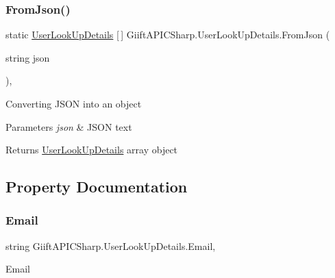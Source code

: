 \subsubsection{\texorpdfstring{From\+Json()}{FromJson()}}
{\footnotesize\ttfamily static \hyperlink{class_giift_a_p_i_c_sharp_1_1_user_look_up_details}{User\+Look\+Up\+Details} \mbox{[}$\,$\mbox{]} Giift\+A\+P\+I\+C\+Sharp.\+User\+Look\+Up\+Details.\+From\+Json (\begin{DoxyParamCaption}\item[{string}]{json }\end{DoxyParamCaption})\hspace{0.3cm}{\ttfamily [inline]}, {\ttfamily [static]}}



Converting J\+S\+ON into an object 


\begin{DoxyParams}{Parameters}
{\em json} & J\+S\+ON text\\
\hline
\end{DoxyParams}
\begin{DoxyReturn}{Returns}
\hyperlink{class_giift_a_p_i_c_sharp_1_1_user_look_up_details}{User\+Look\+Up\+Details} array object
\end{DoxyReturn}


\subsection{Property Documentation}
\mbox{\label{class_giift_a_p_i_c_sharp_1_1_user_look_up_details_ab29eb0535546de8c06da6f52e67a5c7c}} 
\subsubsection{\texorpdfstring{Email}{Email}}
{\footnotesize\ttfamily string Giift\+A\+P\+I\+C\+Sharp.\+User\+Look\+Up\+Details.\+Email\hspace{0.3cm}{\ttfamily [get]}, {\ttfamily [set]}}



Email 

\mbox{\label{class_giift_a_p_i_c_sharp_1_1_user_look_up_details_aa3d73ffd4185c76275a1ccabaa12f6cd}} 
